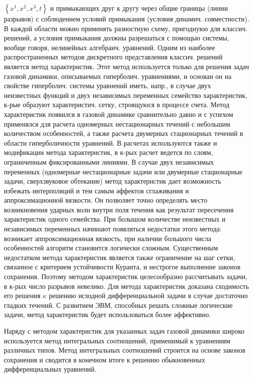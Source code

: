 \documentclass[10pt]{article}
\begin{document}
$\left\{x^{1}, x^{2}, x^{3}, t\right\}$ и примыкающих друг к другу через общие границы (линии разрывов) с соблюдением условий примыкания (условия динамич. совместности). В каждой области можно применять разностную схему, пригоднуюо для классич. решений, а условия примыкания должны разрешаться с помощью системы, вообще говоря, нелинейных алгебраич. уравнений. Одним из наиболее распространенных методов дискретного представления классич. решений является метод характеристик. Этот метод используется только для решения задач газовой динамики, описываемых гиперболич. уравнениями, и основан он на свойстве гиперболич. системы уравнений иметь, напр., в случае двух неизвестных функций и двух независимых переменных семейство характеристик, к-рые образуют характеристич. сетку, строящуюся в процессе счета. Метод характеристик появился в газовой динамике сравнительно давно и с успехом применялся для расчета одномерных нестационарных течений с небольшим количеством особенностей, а также расчета двумерных стационарных течений в области гиперболичности уравнений. В расчетах используются также и модификации метода характеристик, в к-рых расчет ведется по слоям, ограниченным фиксированными линиями. В случае двух независимых переменных (одномерные нестационарные задачи или двумерные стационарные задачи, сверхзвуковое обтекание) метод характеристик дает возможность избежать интерполяций и тем самым әффектов сглаживания и аппроксимационной вязкости. Он позволяет точно определять место возникновения ударных волн внутри поля течения как результат пересечения характеристик одного семейства. При болышом количестве неизвестных и независимых переменных начинают появляться недостатки этого метода: возникает аппроксимационная вязкость, при наличии большого числа особенностей алгоритм становится логически сложным. Существенным недостатком метода характеристик является также ограничение на шаг сетки, связанное с критерием устойчивости Куранта, и нестрогое выполнение законов сохранения. Поэтому методом характеристик целесообразно рассчитывать задачи, в к-рых число разрывов невелико. Для метода характеристик доказана сходимость его решения $\kappa$ решению исходной дифференциальной задачи в случае достаточно гладких течений. С развитием ЭВМ, способных решать сложные логические задачи, метод характеристик будет использоваться более әффективно.



Наряду с методом характеристик для указанных задач газовой динамики широко используется метод интегральных соотношений, применимый $к$ уравнениям различных типов. Метод интегральных соотношений строится на основе законов сохранения и сводится в конечном итоге к решению обыкновенных дифференциальных уравнений.
\end{document}
